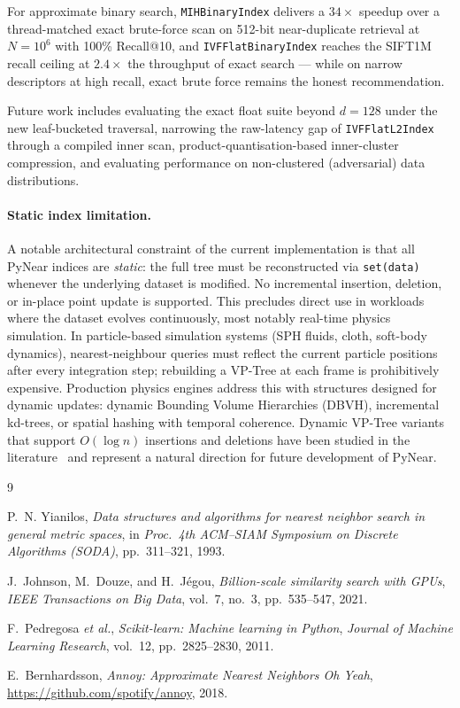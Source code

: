 \documentclass[11pt,a4paper]{article}
\begin{document}
For approximate binary search, \texttt{MIHBinaryIndex} delivers a
$34\times$ speedup over a thread-matched exact brute-force scan on 512-bit
near-duplicate retrieval at $N=10^6$ with 100\% Recall@10, and
\texttt{IVFFlatBinaryIndex} reaches the SIFT1M recall ceiling at
$2.4\times$ the throughput of exact search — while on narrow descriptors
at high recall, exact brute force remains the honest recommendation.

Future work includes evaluating the exact float suite beyond $d=128$ under
the new leaf-bucketed traversal, narrowing the raw-latency gap of
\texttt{IVFFlatL2Index} through a compiled inner scan,
product-quantisation-based inner-cluster compression, and
evaluating performance on non-clustered (adversarial) data distributions.

\paragraph{Static index limitation.}
A notable architectural constraint of the current implementation is that all
PyNear indices are \emph{static}: the full tree must be reconstructed via
\texttt{set(data)} whenever the underlying dataset is modified.  No
incremental insertion, deletion, or in-place point update is supported.
This precludes direct use in workloads where the dataset evolves continuously,
most notably real-time physics simulation.  In particle-based simulation
systems (SPH fluids, cloth, soft-body dynamics), nearest-neighbour queries
must reflect the current particle positions after every integration step;
rebuilding a VP-Tree at each frame is prohibitively expensive.  Production
physics engines address this with structures designed for dynamic updates:
dynamic Bounding Volume Hierarchies (DBVH), incremental kd-trees, or spatial
hashing with temporal coherence.  Dynamic VP-Tree variants that support
$O(\log n)$ insertions and deletions have been studied in the
literature~\cite{yianilos1993data} and represent a natural direction for
future development of PyNear.

\begin{thebibliography}{9}

P.~N. Yianilos,
\textit{Data structures and algorithms for nearest neighbor search in general
metric spaces},
in \textit{Proc.\ 4th ACM--SIAM Symposium on Discrete Algorithms (SODA)},
pp.~311--321, 1993.

J.~Johnson, M.~Douze, and H.~J{\'{e}}gou,
\textit{Billion-scale similarity search with GPUs},
\textit{IEEE Transactions on Big Data}, vol.~7, no.~3, pp.~535--547, 2021.

F.~Pedregosa \textit{et al.},
\textit{Scikit-learn: Machine learning in Python},
\textit{Journal of Machine Learning Research}, vol.~12, pp.~2825--2830, 2011.

E.~Bernhardsson,
\textit{Annoy: Approximate Nearest Neighbors Oh Yeah},
\url{https://github.com/spotify/annoy}, 2018.

\end{thebibliography}
\end{document}
